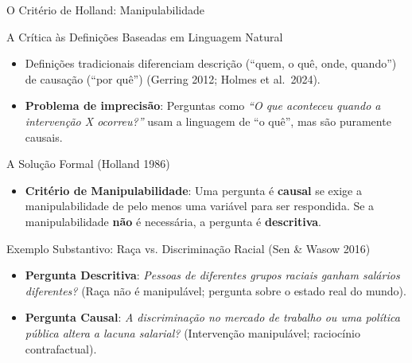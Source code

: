 \documentclass[
  ignorenonframetext,
  aspectratio=169,
  brazilian,
  t,
  10pt]{beamer}
\providecommand{\tightlist}{%
  \setlength{\itemsep}{0pt}\setlength{\parskip}{0pt}}
\begin{document}
\begin{frame}{O Critério de Holland: Manipulabilidade}
\protect{}\label{o-crituxe9rio-de-holland-manipulabilidade}
\begin{block}{A Crítica às Definições Baseadas em Linguagem Natural}
\protect{}\label{a-cruxedtica-uxe0s-definiuxe7uxf5es-baseadas-em-linguagem-natural}
\begin{itemize}
\tightlist
\item
  Definições tradicionais diferenciam descrição (``quem, o quê, onde,
  quando'') de causação (``por quê'') (Gerring 2012; Holmes et
  al.~2024).
\item
  \textbf{Problema de imprecisão}: Perguntas como \emph{``O que
  aconteceu quando a intervenção X ocorreu?''} usam a linguagem de ``o
  quê'', mas são puramente causais.
\end{itemize}
\end{block}

\begin{block}{A Solução Formal (Holland 1986)}
\protect{}\label{a-soluuxe7uxe3o-formal-holland-1986}
\begin{itemize}
\tightlist
\item
  \textbf{Critério de Manipulabilidade}: Uma pergunta é \textbf{causal}
  se exige a manipulabilidade de pelo menos uma variável para ser
  respondida. Se a manipulabilidade \textbf{não} é necessária, a
  pergunta é \textbf{descritiva}.
\end{itemize}

\begin{exampleblock}{Exemplo Substantivo: Raça vs. Discriminação Racial (Sen \& Wasow 2016)}
\begin{itemize}
  \item \textbf{Pergunta Descritiva}: \textit{Pessoas de diferentes grupos raciais ganham salários diferentes?} (Raça não é manipulável; pergunta sobre o estado real do mundo).
  \item \textbf{Pergunta Causal}: \textit{A discriminação no mercado de trabalho ou uma política pública altera a lacuna salarial?} (Intervenção manipulável; raciocínio contrafactual).
\end{itemize}
\end{exampleblock}
\end{block}
\end{frame}
\end{document}
